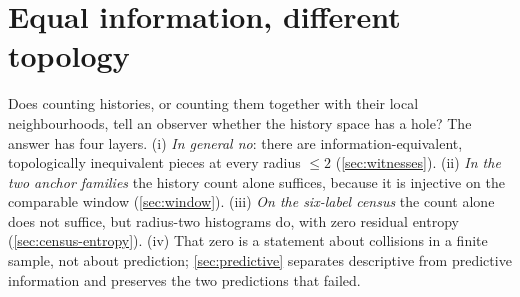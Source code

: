 \chapter{Equal information, different topology}\label{ch:separation}

Does counting histories, or counting them together with their local neighbourhoods, tell an observer whether the history space has a hole? The answer has four layers. (i) \emph{In general no}: there are information-equivalent, topologically inequivalent pieces at every radius $\le2$ (\cref{sec:witnesses}). (ii) \emph{In the two anchor families} the history count alone suffices, because it is injective on the comparable window (\cref{sec:window}). (iii) \emph{On the six-label census} the count alone does not suffice, but radius-two histograms do, with zero residual entropy (\cref{sec:census-entropy}). (iv) That zero is a statement about collisions in a finite sample, not about prediction; \cref{sec:predictive} separates descriptive from predictive information and preserves the two predictions that failed.

